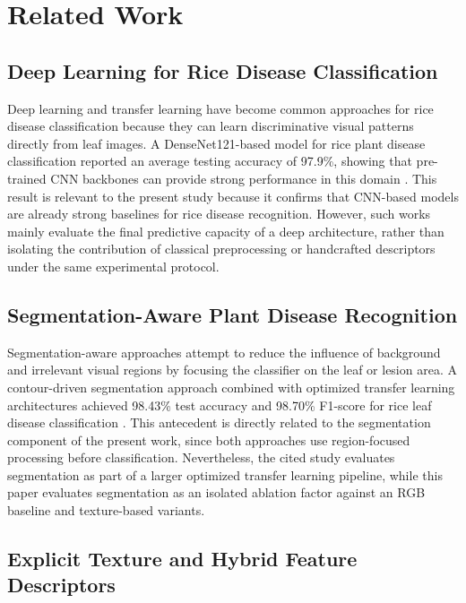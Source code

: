 \section{Related Work}

\subsection{Deep Learning for Rice Disease Classification}

Deep learning and transfer learning have become common approaches for rice disease classification because they can learn discriminative visual patterns directly from leaf images. A DenseNet121-based model for rice plant disease classification reported an average testing accuracy of 97.9\%, showing that pre-trained CNN backbones can provide strong performance in this domain \cite{ismail2026densenet}. This result is relevant to the present study because it confirms that CNN-based models are already strong baselines for rice disease recognition. However, such works mainly evaluate the final predictive capacity of a deep architecture, rather than isolating the contribution of classical preprocessing or handcrafted descriptors under the same experimental protocol.

\subsection{Segmentation-Aware Plant Disease Recognition}

Segmentation-aware approaches attempt to reduce the influence of background and irrelevant visual regions by focusing the classifier on the leaf or lesion area. A contour-driven segmentation approach combined with optimized transfer learning architectures achieved 98.43\% test accuracy and 98.70\% F1-score for rice leaf disease classification \cite{shakeel2026contour}. This antecedent is directly related to the segmentation component of the present work, since both approaches use region-focused processing before classification. Nevertheless, the cited study evaluates segmentation as part of a larger optimized transfer learning pipeline, while this paper evaluates segmentation as an isolated ablation factor against an RGB baseline and texture-based variants.

\subsection{Explicit Texture and Hybrid Feature Descriptors}

